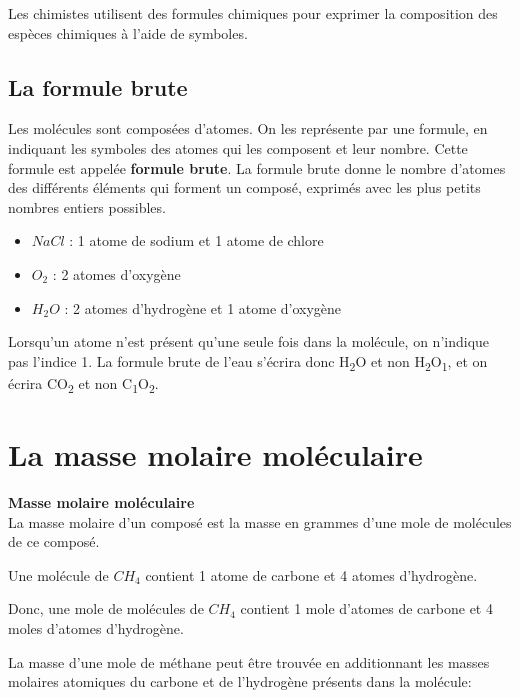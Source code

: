 \documentclass[
  11pt,
  a4paper,
  openany]{book}
\providecommand{\tightlist}{%
  \setlength{\itemsep}{0pt}\setlength{\parskip}{0pt}}
\begin{document}
Les chimistes utilisent des formules chimiques pour exprimer la composition des espèces chimiques à l'aide de symboles.

\subsection{La formule brute}\label{la-formule-brute}

Les molécules sont composées d'atomes. On les représente par une formule, en indiquant les symboles des atomes qui les composent et leur nombre. Cette formule est appelée \textbf{formule brute}. La formule brute donne le nombre d'atomes des différents éléments qui forment un composé, exprimés avec les plus petits nombres entiers possibles.

\begin{itemize}
\tightlist
\item
  \(NaCl\) : 1 atome de sodium et 1 atome de chlore\\
\item
  \(O_2\) : 2 atomes d'oxygène\\
\item
  \(H_2O\) : 2 atomes d'hydrogène et 1 atome d'oxygène
\end{itemize}

Lorsqu'un atome n'est présent qu'une seule fois dans la molécule, on n'indique pas l'indice 1. La formule brute de l'eau s'écrira donc H\textsubscript{2}O et non H\textsubscript{2}O\textsubscript{1}, et on écrira CO\textsubscript{2} et non C\textsubscript{1}O\textsubscript{2}.

\section{La masse molaire moléculaire}\label{la-masse-molaire-moluxe9culaire}

\begin{tcolorbox}
\textbf{Masse molaire moléculaire}\\
La masse molaire d'un composé est la masse en grammes d'une mole de molécules de ce composé.

\end{tcolorbox}

Une molécule de \(CH_4\) contient 1 atome de carbone et 4 atomes d'hydrogène.

Donc, une mole de molécules de \(CH_4\) contient 1 mole d'atomes de carbone et 4 moles d'atomes d'hydrogène.

La masse d'une mole de méthane peut être trouvée en additionnant les masses molaires atomiques du carbone et de l'hydrogène présents dans la molécule:
\end{document}
